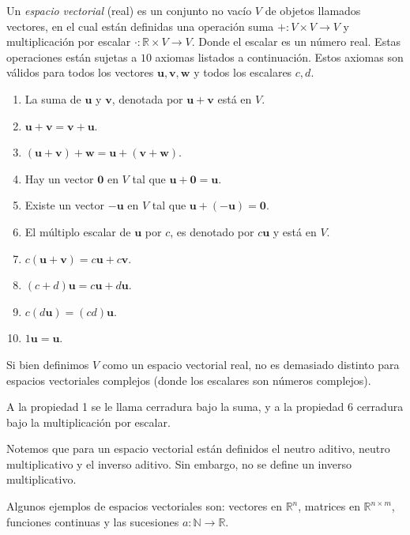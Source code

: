 \documentclass[12pt]{book}
\begin{document}
\begin{definitionenv}
    Un \textit{espacio vectorial} (real) es un conjunto no vacío $V$ de objetos llamados vectores, en el cual están definidas una operación suma $+:V\times V\to V$ y multiplicación por escalar $\cdot:\mathbb{R}\times V\to V$. Donde el escalar es un número real. Estas operaciones están sujetas a $10$ axiomas listados a continuación. Estos axiomas son válidos para todos los vectores $\mathbf{u},\mathbf{v},\mathbf{w}$ y todos los escalares $c,d$.
    \begin{enumerate}
        \item La suma de $\mathbf{u}$ y $\mathbf{v}$, denotada por $\mathbf{u}+\mathbf{v}$ está en $V$.
        \item $\mathbf{u}+\mathbf{v}=\mathbf{v}+\mathbf{u}$.
        \item $(\mathbf{u}+\mathbf{v})+\mathbf{w}=\mathbf{u}+(\mathbf{v}+\mathbf{w})$.
        \item Hay un vector $\mathbf{0}$ en $V$ tal que $\mathbf{u}+\mathbf{0}=\mathbf{u}$.
        \item Existe un vector $-\mathbf{u}$ en $V$ tal que $\mathbf{u}+(-\mathbf{u})=\mathbf{0}$.
        \item El múltiplo escalar de $\mathbf{u}$ por $c$, es denotado por $c\mathbf{u}$ y está en $V$.
        \item $c(\mathbf{u}+\mathbf{v})=c\mathbf{u}+c\mathbf{v}$.
        \item $(c+d)\mathbf{u}=c\mathbf{u}+d\mathbf{u}$.
        \item $c(d\mathbf{u})=(cd)\mathbf{u}$.
        \item $1\mathbf{u}=\mathbf{u}$.
    \end{enumerate}
\end{definitionenv}

Si bien definimos $V$ como un espacio vectorial real, no es demasiado distinto para espacios vectoriales complejos (donde los escalares son números complejos).

A la propiedad 1 se le llama cerradura bajo la suma, y a la propiedad 6 cerradura bajo la multiplicación por escalar.

Notemos que para un espacio vectorial están definidos el neutro aditivo, neutro multiplicativo y el inverso aditivo. Sin embargo, no se define un inverso multiplicativo.

Algunos ejemplos de espacios vectoriales son: vectores en $\mathbb{R}^n$, matrices en $\mathbb{R}^{n\times m}$, funciones continuas y las sucesiones $a:\mathbb{N}\to\mathbb{R}$.\\
\end{document}
